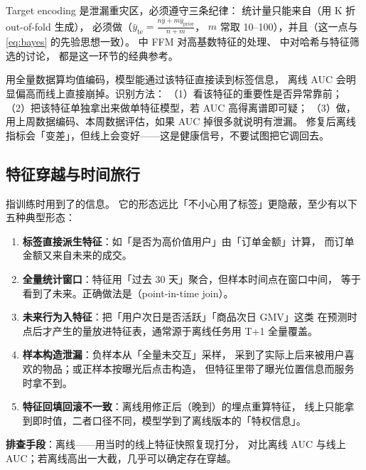 Target encoding 是泄漏重灾区，必须遵守三条纪律：
统计量只能来自（用 K 折 out-of-fold 生成），
必须做（$\bar{y}_{\text{te}} = \frac{n\bar{y} + m\bar{y}_{\text{prior}}}{n+m}$，
$m$ 常取 10--100），并且（这一点与 \cref{eq:bayes} 的先验思想一致）。
\cite{juan2017ffm} 中 FFM 对高基数特征的处理、\cite{he2014practical} 中对哈希与特征筛选的讨论，
都是这一环节的经典参考。

\begin{pitfall}
用全量数据算均值编码，模型能通过该特征直接读到标签信息，
离线 AUC 会明显偏高而线上直接崩掉。识别方法：
（1）看该特征的重要性是否异常靠前；
（2）把该特征单独拿出来做单特征模型，若 AUC 高得离谱即可疑；
（3）做，用上周数据编码、本周数据评估，如果 AUC 掉很多就说明有泄漏。
修复后离线指标会「变差」，但线上会变好——这是健康信号，不要试图把它调回去。
\end{pitfall}

\subsection{特征穿越与时间旅行}

 指训练时用到了的信息。
它的形态远比「不小心用了标签」更隐蔽，至少有以下五种典型形态：

\begin{pitfall}[特征穿越的五种典型形态]
\begin{enumerate}
  \item \textbf{标签直接派生特征}：如「是否为高价值用户」由「订单金额」计算，
        而订单金额又来自未来的成交。
  \item \textbf{全量统计窗口}：特征用「过去 30 天」聚合，但样本时间点在窗口中间，
        等于看到了未来。正确做法是（point-in-time join）。
  \item \textbf{未来行为入特征}：把「用户次日是否活跃」「商品次日 GMV」这类
        在预测时点后才产生的量放进特征表，通常源于离线任务用 T+1 全量覆盖。
  \item \textbf{样本构造泄漏}：负样本从「全量未交互」采样，
        采到了实际上后来被用户喜欢的物品；或正样本按曝光后点击构造，
        但特征里带了曝光位置信息而服务时拿不到。
  \item \textbf{特征回填回滚不一致}：离线用修正后（晚到）的埋点重算特征，
        线上只能拿到即时值，二者口径不同，模型学到了离线版本的「特权信息」。
\end{enumerate}
\textbf{排查手段}：离线——用当时的线上特征快照复现打分，
对比离线 AUC 与线上 AUC；若离线高出一大截，几乎可以确定存在穿越。
\end{pitfall}

